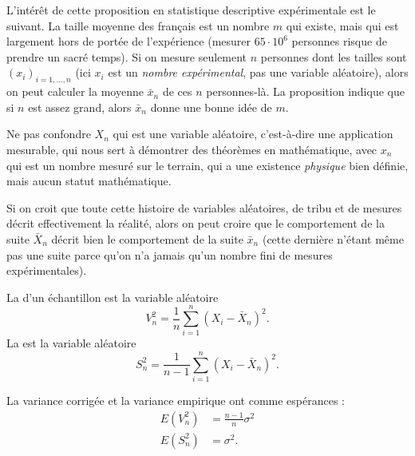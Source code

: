 \begin{remark}
	L'intérêt de cette proposition en statistique descriptive expérimentale est le suivant. La taille moyenne des français est un nombre \( m\) qui existe, mais qui est largement hors de portée de l'expérience (mesurer \( 65\cdot 10^6\) personnes risque de prendre un sacré temps). Si on mesure seulement \( n\) personnes dont les tailles sont \( (x_i)_{i=1,\ldots, n}\) (ici \( x_i\) est un \emph{nombre expérimental}, pas une variable aléatoire), alors on peut calculer la moyenne \( \bar x_n\) de ces \( n\) personnes-là. La proposition indique que si \( n\) est assez grand, alors \( \bar x_n\) donne une bonne idée de \( m\).

	Ne pas confondre \( X_n\) qui est une variable aléatoire, c'est-à-dire une application mesurable, qui nous sert à démontrer des théorèmes en mathématique, avec \( x_n\) qui est un nombre mesuré sur le terrain, qui a une existence \emph{physique} bien définie, mais aucun statut mathématique.

	Si on croit que toute cette histoire de variables aléatoires, de tribu et de mesures décrit effectivement la réalité, alors on peut croire que le comportement de la suite \( \bar X_n\) décrit bien le comportement de la suite \( \bar x_n\) (cette dernière n'étant même pas une suite parce qu'on n'a jamais qu'un nombre fini de mesures expérimentales).
\end{remark}

La  d'un échantillon est la variable aléatoire
\begin{equation}
	V_n^2=\frac{1}{ n }\sum_{i=1}^n(X_i-\bar X_n)^2.
\end{equation}
La  est la variable aléatoire
\begin{equation}        \label{Eqdefvarempicorri}
	S_n^2=\frac{1}{ n-1 }\sum_{i=1}^n(X_i-\bar X_n)^2.
\end{equation}

\begin{lemma}
	La variance corrigée et la variance empirique ont comme espérances :
	\begin{subequations}
		\begin{align}
			E(V_n^2) & =\frac{ n-1 }{ n }\sigma^2 \\
			E(S_n^2) & =\sigma^2.
		\end{align}
	\end{subequations}
\end{lemma}

